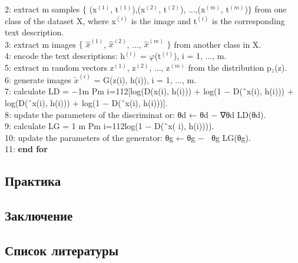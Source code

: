 \documentclass{article}
\begin{document}
    2: \indent extract m samples $\{$ (x$^(1)$, t$^(1)$),(x$^(2)$, t$^(2)$), ...,(x$^(m)$, t$^(m)$)$\}$ from one class of the dataset X, where x$^(i)$ is the image and t$^(i)$ is the corresponding text description.\\
    3: \indent extract m images $\{$ $\hat{x}^(1)$, $\hat{x}^(2)$, ..., $\hat{x}^(m)$ $\}$ from another class in X.\\
    4: \indent encode the text descriptions: h$^(i)$ = $\varphi$(t$^(i)$), i = 1, ..., m.\\
    5: \indent extract m random vectors {z$^(1)$, z$^(2)$, ..., z$^(m)$} from the distribution p$_z$(z).\\
    6: \indent generate images $\widetilde{x}^(i)$ = G(z(i), h(i)), i = 1, ..., m.\\
    7: \indent calculate LD = −1m Pm i=112[log(D(x(i), h(i))) + log(1 − D(˜x(i), h(i))) + log(D(ˆx(i), h(i))) + log(1 − D(ˆx(i), h(i)))].\\
    8: \indent update the parameters of the discriminat or: θd ← θd − ∇θd LD(θd).\\
    9: \indent calculate LG = 1 m Pm i=112log(1 − D(˜x( i), h(i)))).\\
    10: \indent update the parameters of the generator: θg ← θg − ∇θg LG(θg).\\
    11: \textbf {end for}
    
    \newpage
    \begin{center} 
    \section{Практика}
    \end{center} 
    
    \newpage
    \begin{center} 
    \section{Заключение}
    \end{center} 
    
    \newpage
    \begin{center} 
    \section{Список литературы}
    \end{center} 
    
\end{document}
